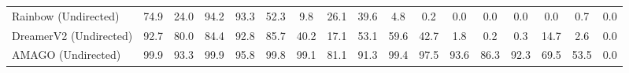 \begin{table}[ht]
{\begin{tabular}{@{}lcccccccccccccccc@{}}
Rainbow (Undirected) \cite{hessel2018rainbow}             & 74.9                                                    & 24.0                                                     & 94.2                                                   & 93.3                                               & 52.3                                                   & 9.8                                                   & 26.1                                               & 39.6                                                     & 4.8                                                     & 0.2                                                      & 0.0                                                      & 0.0                                                      & 0.0                                                    & 0.0                                                     & 0.7                                                        & 0.0                                                              \\
DreamerV2 (Undirected)\cite{hafner2020mastering}            & 92.7                                                    & 80.0                                                     & 84.4                                                   & 92.8                                               & 85.7                                                   & 40.2                                                  & 17.1                                               & 53.1                                                     & 59.6                                                    & 42.7                                                     & 1.8                                                      & 0.2                                                      & 0.3                                                    & 14.7                                                    & 2.6                                                        & 0.0                                                              \\
AMAGO (Undirected)        & 99.9                                                    & 93.3                                                     & 99.9                                                   & 95.8                                               & 99.8                                                   & 99.1                                                  & 81.1                                               & 91.3                                                     & 99.4                                                    & 97.5                                                     & 93.6                                                     & 86.3                                                     & 92.3                                                   & 69.5                                                    & 53.5                                                       & 0.0                                                              \\ \midrule

\end{tabular}}
\end{table}

